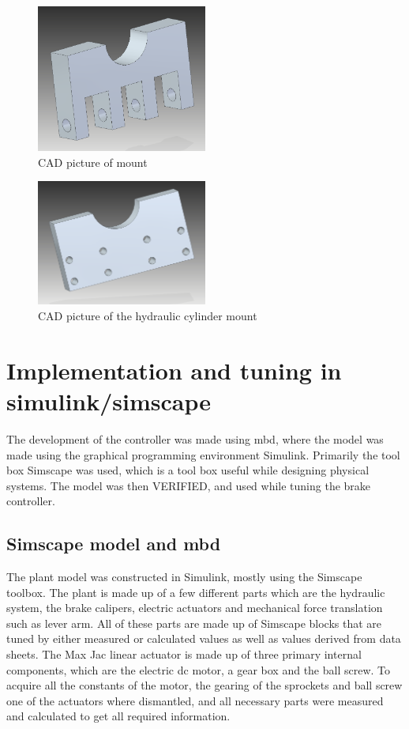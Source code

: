 \documentclass[a4paper,11pt]{kth-mag}
\begin{document}
\begin{figure}[h]
\centering
\includegraphics[width=0.5\textwidth]{Actuator_mount}
\caption{CAD picture of mount}
\label{fig:CAD_Actuator_mount}
\end{figure}

\begin{figure}[h]
\centering
\includegraphics[width=0.5\textwidth]{Hydraulic_cylinder_mount}
\caption{CAD picture of the hydraulic cylinder mount}
\label{fig:CAD_Hydraulic_cylinder_mount}
\end{figure}



\section{Implementation and tuning in simulink/simscape}

The development of the controller was made using \gls{mbd}, where the model was made using the graphical programming environment Simulink. Primarily the tool box Simscape was used, which is a tool box useful while designing physical systems. The model was then VERIFIED, and used while tuning the brake controller. 

\subsection{Simscape model and \gls{mbd}}
The plant model was constructed in Simulink, mostly using the Simscape toolbox. The plant is made up of a few different parts which are the hydraulic system, the brake calipers, electric actuators and mechanical force translation such as lever arm. All of these parts are made up of Simscape blocks that are tuned by either measured or calculated values as well as values derived from data sheets. The Max Jac linear actuator is made up of three primary internal components, which are the electric \gls{dc} motor, a gear box and the ball screw. To acquire all the constants of the motor, the gearing of the sprockets and ball screw one of the actuators where dismantled, and all necessary parts were measured and calculated to get all required information. 
\end{document}
